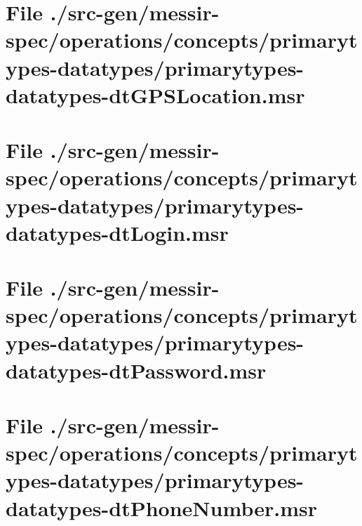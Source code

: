 \section[File /src-gen/messir-spec.../primarytypes-datatypes-dtGPSLocation.msr]{File ./src-gen/messir-spec/operations/concepts/primarytypes-datatypes/primarytypes-datatypes-dtGPSLocation.msr}
\scriptsize

\normalsize
	
\section[File /src-gen/messir-spec/operations.../primarytypes-datatypes-dtLogin.msr]{File ./src-gen/messir-spec/operations/concepts/primarytypes-datatypes/primarytypes-datatypes-dtLogin.msr}
\scriptsize

\normalsize
	
\section[File /src-gen/messir-spec/operations.../primarytypes-datatypes-dtPassword.msr]{File ./src-gen/messir-spec/operations/concepts/primarytypes-datatypes/primarytypes-datatypes-dtPassword.msr}
\scriptsize

\normalsize
	
\section[File /src-gen/messir-spec.../primarytypes-datatypes-dtPhoneNumber.msr]{File ./src-gen/messir-spec/operations/concepts/primarytypes-datatypes/primarytypes-datatypes-dtPhoneNumber.msr}
\scriptsize

\normalsize
	
